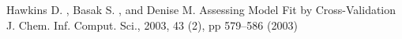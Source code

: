 \documentclass{llncs}
\begin{document}
%
%
\begin{thebibliography}{5}
%

Hawkins D. , Basak S. , and Denise M. 
Assessing Model Fit by Cross-Validation
J. Chem. Inf. Comput. Sci., 2003, 43 (2), pp 579–586 (2003)

\end{thebibliography}
\end{document}

